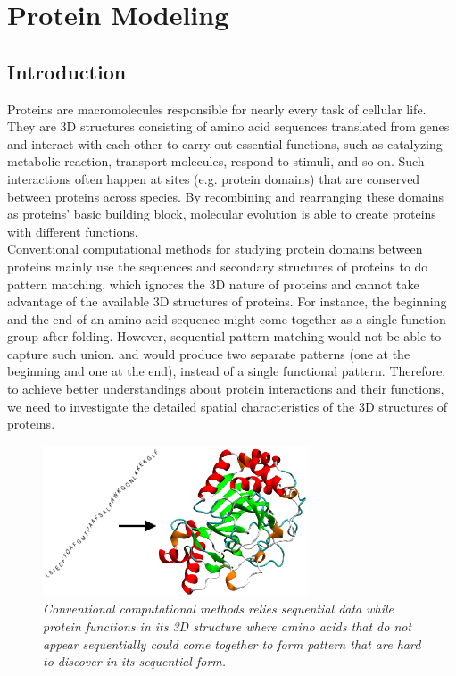 \chapter{Protein Modeling}

\section{Introduction}

Proteins are macromolecules responsible for nearly every task of cellular life. They are 3D structures consisting of amino acid sequences translated from genes and interact with each other to carry out essential functions, such as catalyzing metabolic reaction, transport molecules, respond to stimuli, and so on. Such interactions often happen at sites (e.g. protein domains) that are conserved between proteins across species. By recombining and rearranging these domains as proteins' basic building block, molecular evolution is able to create proteins with different functions.\\

Conventional computational methods for studying protein domains between proteins mainly use the sequences and secondary structures of proteins to do pattern matching, which ignores the 3D nature of proteins and cannot take advantage of the available 3D structures of proteins. For instance, the beginning and the end of an amino acid sequence might come together as a single function group after folding. However, sequential pattern matching would not be able to capture such union. and would produce two separate patterns (one at the beginning and one at the end), instead of a single functional pattern. Therefore, to achieve better understandings about protein interactions and their functions, we need to investigate the detailed spatial characteristics of the 3D structures of proteins. \\

\begin{figure}[h]
	\centering
	\captionsetup{justification=centering}
	\includegraphics[width=0.7\textwidth]{figs/protein_folding.png}
	\caption[Caption for LOF]{\emph{Conventional computational methods relies sequential data while protein functions in its 3D structure where amino acids that do not appear sequentially could come together to form pattern that are hard to discover in its sequential form.}}
	\label{fig:protein_folding}
\end{figure}


